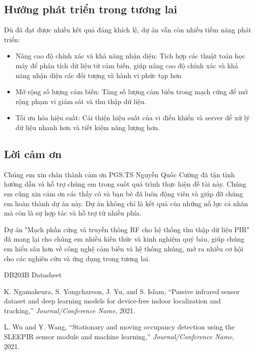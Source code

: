\documentclass{article}
\begin{document}
\subsection{Hướng phát triển trong tương lai}
Dù đã đạt được nhiều kết quả đáng khích lệ, dự án vẫn còn nhiều tiềm năng phát triển:
\begin{itemize}
    \item Nâng cao độ chính xác và khả năng nhận diện: Tích hợp các thuật toán học máy để phân tích dữ liệu từ cảm biến, giúp nâng cao độ chính xác và khả năng nhận diện các đối tượng và hành vi phức tạp hơn
    \item Mở rộng số lượng cảm biến: Tăng số lượng cảm biến trong mạch cứng để mở rộng phạm vi giám sát và thu thập dữ liệu.
    \item Tối ưu hóa hiệu suất: Cải thiện hiệu suất của vi điều khiển và server để xử lý dữ liệu nhanh hơn và tiết kiệm năng lượng hơn.
\end{itemize}
\subsection{Lời cảm ơn}
Chúng em xin chân thành cảm ơn PGS.TS Nguyễn Quốc Cường đã tận tình hướng dẫn và hỗ trợ chúng em trong suốt quá trình thực hiện đề tài này. Chúng em cũng xin cảm ơn các thầy cô và bạn bè đã luôn động viên và giúp đỡ chúng em hoàn thành dự án này. Dự án không chỉ là kết quả của những nỗ lực cá nhân mà còn là sự hợp tác và hỗ trợ từ nhiều phía.

Dự án "Mạch phần cứng và truyền thông RF cho hệ thống thu thập dữ liệu PIR" đã mang lại cho chúng em nhiều kiến thức và kinh nghiệm quý báu, giúp chúng em hiểu sâu hơn về công nghệ cảm biến và hệ thống nhúng, mở ra nhiều cơ hội cho các nghiên cứu và ứng dụng trong tương lai.
\cleardoublepage

\begin{thebibliography}{99}

    DB203B Datasheet
    
    K. Ngamakeura, S. Yongchareon, J. Yu, and S. Islam, ``Passive infrared sensor dataset and deep learning models for device-free indoor localization and tracking,'' \textit{Journal/Conference Name}, 2021.
    
    L. Wu and Y. Wang, ``Stationary and moving occupancy detection using the SLEEPIR sensor module and machine learning,'' \textit{Journal/Conference Name}, 2021.
    
    \end{thebibliography}
    
    
\end{document}
